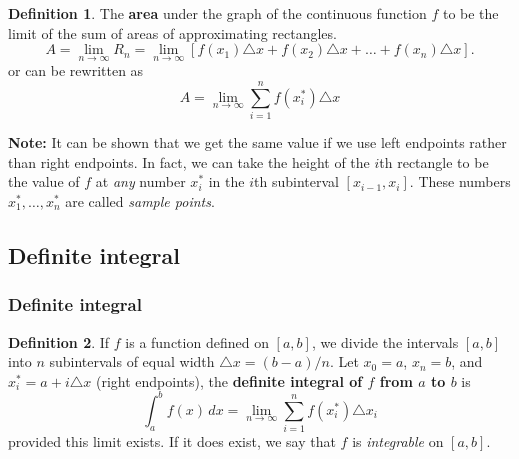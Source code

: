\documentclass[t]{beamer}
\theoremstyle{plain}
\theoremstyle{definition}
\newtheorem{dfn}{Definition}
\begin{document}
\begin{frame}

\begin{dfn}
\noindent The \textbf{area} under the graph of the continuous function $f$ to be the limit of the sum of areas of approximating rectangles.
\[ A = \lim_{n\rightarrow \infty} R_{n} = \lim_{n\rightarrow \infty}[f(x_{1})\triangle x + f(x_{2})\triangle x + \ldots + f(x_{n})\triangle x].\]
or can be rewritten as
$$A = \lim_{n\rightarrow \infty} \sum_{i=1}^n f(x_{i}^{*}) \triangle x$$
\end{dfn}

\medskip

\noindent \textbf{Note:} It can be shown that we get the same value if we use left endpoints rather than right endpoints.  In fact, we can take the height of the $i$th rectangle to be the value of $f$ at \emph{any} number $x_{i}^{*}$ in the $i$th subinterval $[x_{i-1}, x_{i}]$.  These numbers $x_{1}^{*},\ldots, x_{n}^{*}$ are called \emph{sample points}.
\end{frame}

%
%
%
%
%
%
%
%
%
%
%

\subsection{Definite integral}
\begin{frame}
\frametitle{Definite integral}
\begin{dfn} If $f$ is a function defined on $[a,b]$,  we divide the intervals $[a, b]$ into $n$ subintervals of equal width $\triangle x = (b-a)/n$.   Let $x_0 = a$, $x_n = b$,  and $x_i^{*} = a + i \triangle x$ (right endpoints), the \textbf{definite integral of $f$ from $a$ to $b$} is
\[ \int_{a}^{b} f(x)\,dx = \lim_{n\rightarrow \infty} \sum_{i=1}^{n} f(x_{i}^{*})\triangle x_{i}\]
provided this limit exists.  If it does exist, we say that $f$ is \emph{integrable} on $[a,b]$.
\end{dfn}

\end{frame}
\end{document}
